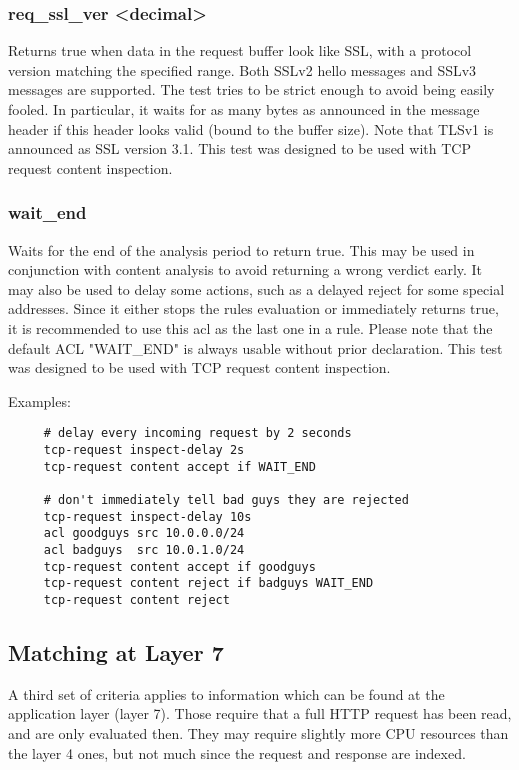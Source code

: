 \subsubsection[req\_ssl\_ver]{req\_ssl\_ver <decimal>}
  Returns true when data in the request buffer look like SSL, with a protocol
  version matching the specified range. Both SSLv2 hello messages and SSLv3
  messages are supported. The test tries to be strict enough to avoid being
  easily fooled. In particular, it waits for as many bytes as announced in the
  message header if this header looks valid (bound to the buffer size). Note
  that TLSv1 is announced as SSL version 3.1. This test was designed to be used
  with TCP request content inspection.

\subsubsection[wait\_end]{wait\_end}
  Waits for the end of the analysis period to return true. This may be used in
  conjunction with content analysis to avoid returning a wrong verdict early.
  It may also be used to delay some actions, such as a delayed reject for some
  special addresses. Since it either stops the rules evaluation or immediately
  returns true, it is recommended to use this acl as the last one in a rule.
  Please note that the default ACL "WAIT\_END" is always usable without prior
  declaration. This test was designed to be used with TCP request content
  inspection.

  Examples:
  \begin{verbatim}
     # delay every incoming request by 2 seconds
     tcp-request inspect-delay 2s
     tcp-request content accept if WAIT_END

     # don't immediately tell bad guys they are rejected
     tcp-request inspect-delay 10s
     acl goodguys src 10.0.0.0/24
     acl badguys  src 10.0.1.0/24
     tcp-request content accept if goodguys
     tcp-request content reject if badguys WAIT_END
     tcp-request content reject
  \end{verbatim}

\subsection{Matching at Layer 7}

A third set of criteria applies to information which can be found at the
application layer (layer 7). Those require that a full HTTP request has been
read, and are only evaluated then. They may require slightly more CPU resources
than the layer 4 ones, but not much since the request and response are indexed.

